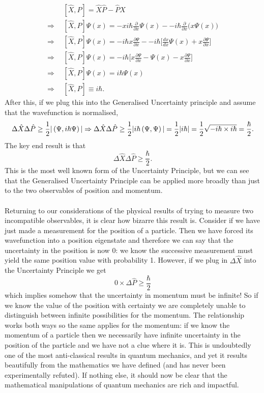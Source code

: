 $$
\begin{aligned}
&[\hat{X},\hat{P}]=\hat{X}\hat{P}-\hat{P}\hat{X}\\
\Rightarrow\:\:&[\hat{X},\hat{P}]\Psi(x)=-xi\hbar\frac{\partial}{\partial x}\Psi(x)--i\hbar\frac{\partial}{\partial x}\biggl(x\Psi(x)\biggr)\\
\Rightarrow\:\:&[\hat{X},\hat{P}]\Psi(x)=-i\hbar x\frac{\partial \Psi}{\partial x}--i\hbar\biggl[\frac{dx}{dx}\Psi(x)+x\frac{\partial\Psi}{\partial x}\biggr]\\
\Rightarrow\:\:&[\hat{X},\hat{P}]\Psi(x)=-i\hbar\biggl[x\frac{\partial\Psi}{\partial x}-\Psi(x)-x\frac{\partial\Psi}{\partial x}\biggr]\\
\Rightarrow\:\:&[\hat{X},\hat{P}]\Psi(x)=i\hbar\Psi(x)\\
\Rightarrow\:\:&[\hat{X},\hat{P}]\equiv i\hbar.
\end{aligned}
$$
After this, if we plug this into the Generalised Uncertainty principle and assume that the wavefunction is normalised,
$$
\Delta{\hat{X}}\Delta{\hat{P}}\geq\frac{1}{2}|\left(\Psi,i\hbar\Psi\right)| \Rightarrow \Delta{\hat{X}}\Delta{\hat{P}}\geq\frac{1}{2}|i\hbar\left(\Psi,\Psi\right)|=\frac{1}{2}|i\hbar|=\frac{1}{2}\sqrt{-i\hbar\times i\hbar}=\frac{\hbar}{2}.
$$
The key end result is that 
$$
\Delta{\hat{X}}\Delta{\hat{P}}\geq\frac{\hbar}{2}.
$$
This is the most well known form of the Uncertainty Principle, but we can see that the Generalised Uncertainty Principle can be applied more broadly than just to the two observables of position and momentum. 
\\\\
Returning to our considerations of the physical results of trying to measure two incompatible observables, it is clear how bizarre this result is. Consider if we have just made a measurement for the position of a particle. Then we have forced its wavefunction into a position eigenstate and therefore we can say that the uncertainty in the position is now $0$: we know the successive measurement must yield the same position value with probability 1. However, if we plug in $\Delta{\hat{X}}$ into the Uncertainty Principle we get 
$$
0\times\Delta\hat{P}\geq\frac{\hbar}{2}
$$
which implies somehow that the uncertainty in momentum must be infinite! So if we know the value of the position with certainty we are completely unable to distinguish between infinite possibilities for the momentum. The relationship works both ways so the same applies for the momentum: if we know the momentum of a particle then we necessarily have infinite uncertainty in the position of the particle and we have not a clue where it is. This is undoubtedly one of the most anti-classical results in quantum mechanics, and yet it results beautifully from the mathematics we have defined (and has never been experimentally refuted). If nothing else, it should now be clear that the mathematical manipulations of quantum mechanics are rich and impactful.
